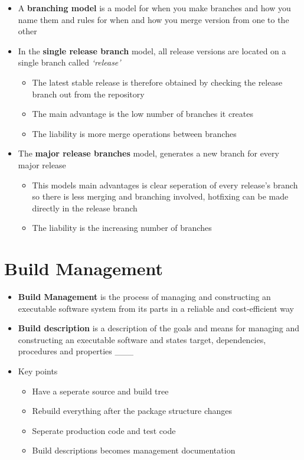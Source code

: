 \documentclass[11pt]{article}
\providecommand{\tightlist}{%
      \setlength{\itemsep}{0pt}\setlength{\parskip}{0pt}}
\begin{document}
\begin{itemize}
\item
  A \textbf{branching model} is a model for when you make branches and
  how you name them and rules for when and how you merge version from
  one to the other
\item
  In the \textbf{single release branch} model, all release versions are
  located on a single branch called \emph{`release'}

  \begin{itemize}
  \tightlist
  \item
    The latest stable release is therefore obtained by checking the
    release branch out from the repository
  \item
    The main advantage is the low number of branches it creates
  \item
    The liability is more merge operations between branches
  \end{itemize}
\item
  The \textbf{major release branches} model, generates a new branch for
  every major release

  \begin{itemize}
  \tightlist
  \item
    This models main advantages is clear seperation of every release's
    branch so there is less merging and branching involved, hotfixing
    can be made directly in the release branch
  \item
    The liability is the increasing number of branches
  \end{itemize}
\end{itemize}

    \hypertarget{build-management}{%
\section{Build Management}\label{build-management}}

\begin{itemize}
\item
  \textbf{Build Management} is the process of managing and constructing
  an executable software system from its parts in a reliable and
  cost-efficient way
\item
  \textbf{Build description} is a description of the goals and means for
  managing and constructing an executable software and states target,
  dependencies, procedures and properties \_\_\_
\item
  Key points

  \begin{itemize}
  \tightlist
  \item
    Have a seperate source and build tree
  \item
    Rebuild everything after the package structure changes
  \item
    Seperate production code and test code
  \item
    Build descriptions becomes management documentation
  \end{itemize}
\end{itemize}
\end{document}
